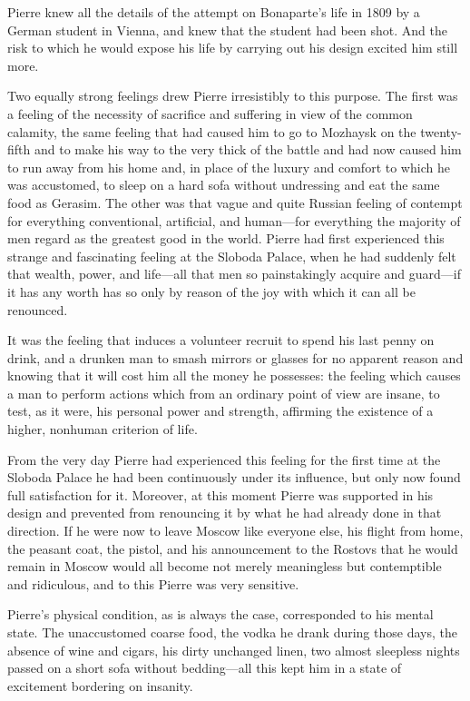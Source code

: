 Pierre knew all the details of the attempt on Bonaparte's life in
1809 by a German student in Vienna, and knew that the student had
been shot.  And the risk to which he would expose his life by
carrying out his design excited him still more.

Two equally strong feelings drew Pierre irresistibly to this
purpose.  The first was a feeling of the necessity of sacrifice
and suffering in view of the common calamity, the same feeling
that had caused him to go to Mozhaysk on the twenty-fifth and to
make his way to the very thick of the battle and had now caused
him to run away from his home and, in place of the luxury and
comfort to which he was accustomed, to sleep on a hard sofa
without undressing and eat the same food as Gerasim. The other
was that vague and quite Russian feeling of contempt for
everything conventional, artificial, and human---for everything
the majority of men regard as the greatest good in the
world. Pierre had first experienced this strange and fascinating
feeling at the Sloboda Palace, when he had suddenly felt that
wealth, power, and life---all that men so painstakingly acquire
and guard---if it has any worth has so only by reason of the joy
with which it can all be renounced.

It was the feeling that induces a volunteer recruit to spend his
last penny on drink, and a drunken man to smash mirrors or
glasses for no apparent reason and knowing that it will cost him
all the money he possesses: the feeling which causes a man to
perform actions which from an ordinary point of view are insane,
to test, as it were, his personal power and strength, affirming
the existence of a higher, nonhuman criterion of life.

From the very day Pierre had experienced this feeling for the
first time at the Sloboda Palace he had been continuously under
its influence, but only now found full satisfaction for
it. Moreover, at this moment Pierre was supported in his design
and prevented from renouncing it by what he had already done in
that direction. If he were now to leave Moscow like everyone
else, his flight from home, the peasant coat, the pistol, and his
announcement to the Rostovs that he would remain in Moscow would
all become not merely meaningless but contemptible and
ridiculous, and to this Pierre was very sensitive.

Pierre's physical condition, as is always the case, corresponded
to his mental state. The unaccustomed coarse food, the vodka he
drank during those days, the absence of wine and cigars, his
dirty unchanged linen, two almost sleepless nights passed on a
short sofa without bedding---all this kept him in a state of
excitement bordering on insanity.

